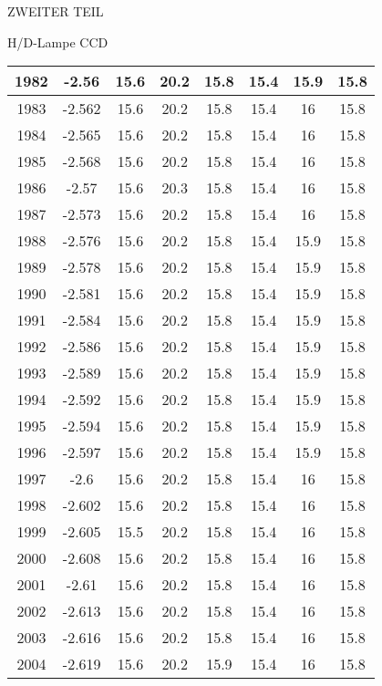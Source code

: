 \begin{appendix}
\begin{chapter}{ZWEITER TEIL}
\begin{section}{H/D-Lampe CCD}
\begin{scriptsize}
\begin{longtable}[htbp]{|c|c|c|c|c|c|c|c|}
            1982 & -2.56 & 15.6 & 20.2 & 15.8 & 15.4 & 15.9 & 15.8 \\ \hline
            1983 & -2.562 & 15.6 & 20.2 & 15.8 & 15.4 & 16 & 15.8 \\ \hline
            1984 & -2.565 & 15.6 & 20.2 & 15.8 & 15.4 & 16 & 15.8 \\ \hline
            1985 & -2.568 & 15.6 & 20.2 & 15.8 & 15.4 & 16 & 15.8 \\ \hline
            1986 & -2.57 & 15.6 & 20.3 & 15.8 & 15.4 & 16 & 15.8 \\ \hline
            1987 & -2.573 & 15.6 & 20.2 & 15.8 & 15.4 & 16 & 15.8 \\ \hline
            1988 & -2.576 & 15.6 & 20.2 & 15.8 & 15.4 & 15.9 & 15.8 \\ \hline
            1989 & -2.578 & 15.6 & 20.2 & 15.8 & 15.4 & 15.9 & 15.8 \\ \hline
            1990 & -2.581 & 15.6 & 20.2 & 15.8 & 15.4 & 15.9 & 15.8 \\ \hline
            1991 & -2.584 & 15.6 & 20.2 & 15.8 & 15.4 & 15.9 & 15.8 \\ \hline
            1992 & -2.586 & 15.6 & 20.2 & 15.8 & 15.4 & 15.9 & 15.8 \\ \hline
            1993 & -2.589 & 15.6 & 20.2 & 15.8 & 15.4 & 15.9 & 15.8 \\ \hline
            1994 & -2.592 & 15.6 & 20.2 & 15.8 & 15.4 & 15.9 & 15.8 \\ \hline
            1995 & -2.594 & 15.6 & 20.2 & 15.8 & 15.4 & 15.9 & 15.8 \\ \hline
            1996 & -2.597 & 15.6 & 20.2 & 15.8 & 15.4 & 15.9 & 15.8 \\ \hline
            1997 & -2.6 & 15.6 & 20.2 & 15.8 & 15.4 & 16 & 15.8 \\ \hline
            1998 & -2.602 & 15.6 & 20.2 & 15.8 & 15.4 & 16 & 15.8 \\ \hline
            1999 & -2.605 & 15.5 & 20.2 & 15.8 & 15.4 & 16 & 15.8 \\ \hline
            2000 & -2.608 & 15.6 & 20.2 & 15.8 & 15.4 & 16 & 15.8 \\ \hline
            2001 & -2.61 & 15.6 & 20.2 & 15.8 & 15.4 & 16 & 15.8 \\ \hline
            2002 & -2.613 & 15.6 & 20.2 & 15.8 & 15.4 & 16 & 15.8 \\ \hline
            2003 & -2.616 & 15.6 & 20.2 & 15.8 & 15.4 & 16 & 15.8 \\ \hline
            2004 & -2.619 & 15.6 & 20.2 & 15.9 & 15.4 & 16 & 15.8 \\ \hline

\end{longtable}
\end{scriptsize}
\end{section}
\end{chapter}
\end{appendix}
